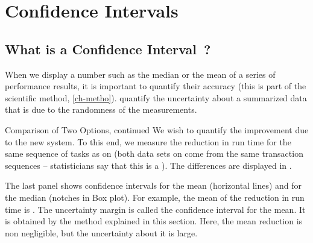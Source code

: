 \section{Confidence Intervals}
\subsection{What is a Confidence Interval~?}
When we display a number such as the median or
the mean of a series of performance results, it
is important to quantify their accuracy (this is
part of the scientific method, \cref{ch-metho}).
 quantify the
uncertainty about a summarized data that is due
to the randomness of the measurements.

\begin{ex}{Comparison of Two Options, continued} %
We wish to quantify the improvement due to the
new system. To this end, we measure the reduction
in run time for the same sequence of tasks as on
 (both data sets on
 come from the same transaction
sequences -- statisticians say that this is a
). The differences are
displayed in .

The last panel shows confidence intervals for the
mean (horizontal lines) and for the median
(notches in Box plot). For example, the mean of
the reduction in run time is $
$.%
%
The uncertainty margin is called the confidence interval for
the mean. It is obtained by the method explained in this
section. Here, the mean reduction is non negligible, but the
uncertainty about it is large.
\end{ex}
\begin{figure}
%
%
 
\end{figure}


